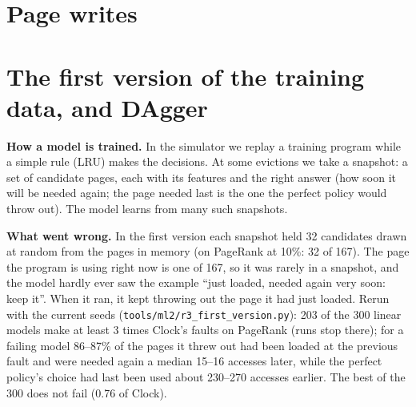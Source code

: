 \documentclass[10.5pt,a4paper]{article}
\newcommand{\code}[1]{\texttt{#1}}
\begin{document}
\begin{table}[h]
\centering\scriptsize
\resizebox{\linewidth}{!}{}
\caption{Faults against Clock and break-even fault cost, per workload.}
\end{table}

\section{Page writes}
\label{app:writes}

\begin{table}[h]
\centering\scriptsize
\resizebox{\linewidth}{!}{}
\caption{5\% memory: page writes to disk relative to Clock, same layout as the fault tables.}
\end{table}
\begin{table}[h]
\centering\scriptsize
\resizebox{\linewidth}{!}{}
\caption{10\% memory: page writes relative to Clock.}
\end{table}
\begin{table}[h]
\centering\scriptsize
\resizebox{\linewidth}{!}{}
\caption{20\% memory: page writes relative to Clock.}
\end{table}

\section{The first version of the training data, and DAgger}
\label{app:first}

\textbf{How a model is trained.} In the simulator we replay a training program while a simple rule (LRU) makes the decisions. At some evictions we take a snapshot: a set of candidate pages, each with its features
and the right answer (how soon it will be needed again; the page needed last is the one the perfect policy would throw out). The model learns from many such snapshots.

\textbf{What went wrong.} In the first version each snapshot held 32 candidates drawn at random from the pages in memory (on PageRank at 10\%: 32 of 167). The page the program is using right now is one of 167, so it was rarely in a snapshot,
and the model hardly ever saw the example ``just loaded, needed again very soon: keep it''. When it ran, it kept throwing out the page it had just loaded. Rerun with the current seeds (\code{tools/ml2/r3\_first\_version.py}):
203 of the 300 linear models make at least 3 times Clock's faults on PageRank (runs stop there); for a failing model 86--87\% of the pages it threw out had been loaded at the previous fault and were needed again a median 15--16 accesses later,
while the perfect policy's choice had last been used about 230--270 accesses earlier. The best of the 300 does not fail (0.76 of Clock).
\end{document}
